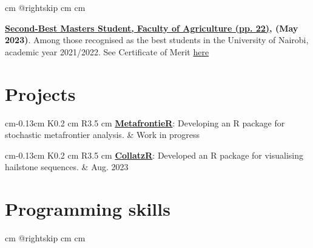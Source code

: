 \documentclass[10pt, letterpaper]{sulmancv}
\begin{document}
        \vspace{0.2 cm}
        \begingroup{} cm
        \advance\csname @rightskip cm
        \advance{} cm

         \textcolor{primaryColor}{\faMedal} \quad \textbf{\href{\detokenize{https://www.uonbi.ac.ke/news/student-recognition-awards-booklet}}{Second-Best Masters Student, Faculty of Agriculture (pp. 22)}, (May 2023)}. Among those recognised as the best students in the University of Nairobi, academic year 2021/2022. See Certificate of Merit \href{\detokenize{https://sulmanolieko.github.io/authors/admin/msc-merit.pdf}}{here} \par\endgroup

    \section{Projects}

        \begin{tabularx}{
             cm-0.13cm
        }{
            K{0.2 cm}
            R{3.5 cm}
        }
           \textcolor{primaryColor}{\faGithub\quad\faCodeBranch}\quad\href{\detokenize{https://github.com/SulmanOlieko/stochastic-metafrontier}}{\textbf{MetafrontieR}}: Developing an R package for stochastic metafrontier analysis.
            &
            Work in progress
        \end{tabularx}
        
        \vspace{0.2cm}
        
        \begin{tabularx}{
             cm-0.13cm
        }{
            K{0.2 cm}
            R{3.5 cm}
        }
            \textcolor{primaryColor}{\faGithub\quad\faCodeBranch}\quad\href{\detokenize{https://github.com/SulmanOlieko/collatzR}}{\textbf{CollatzR}}: Developed an R package for visualising hailstone sequences.
            &
            Aug. 2023
        \end{tabularx}
    
    \section{Programming skills}

        \begingroup{} cm
        \advance\csname @rightskip cm
        \advance{} cm
\end{document}

